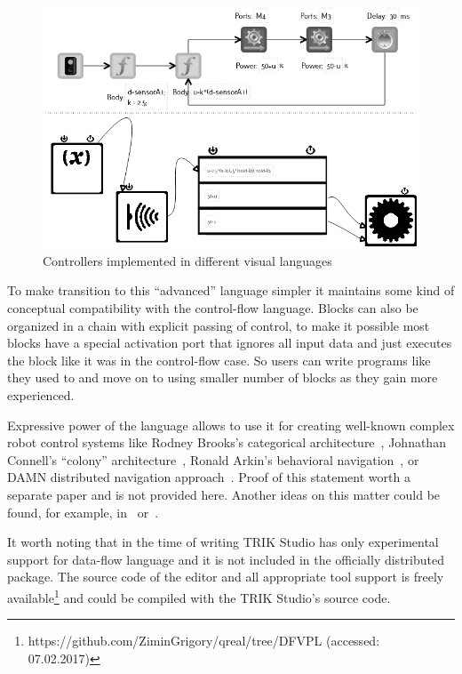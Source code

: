\documentclass[conference]{IEEEtran}
\begin{document}
\begin{figure}[ht]
    \centering
    \includegraphics[width=\columnwidth]{TS_AlongTheBox_Comparison.png}
    \caption{Controllers implemented in different visual languages}
    \label{image:alongTheBox_CF_DF}
\end{figure}

To make transition to this ``advanced'' language simpler it maintains some kind of conceptual compatibility with the control-flow language. Blocks can also be organized in a chain with explicit passing of control, to make it possible most blocks have a special activation port that ignores all input data and just executes the block like it was in the control-flow case. So users can write programs like they used to and move on to using smaller number of blocks as they gain more experienced.

Expressive power of the language allows to use it for creating well-known complex robot control systems like Rodney Brooks's categorical architecture~\cite{brooks1986robust}, Johnathan Connell's ``colony'' architecture~\cite{connell1989colony}, Ronald Arkin's behavioral navigation~\cite{arkin1987motor}, or DAMN distributed navigation approach~\cite{rosenblatt1997damn}. Proof of this statement worth a separate paper and is not provided here. Another ideas on this matter could be found, for example, in~\cite{simpson2009toward} or~\cite{banyasad2000visual}.

It worth noting that in the time of writing TRIK Studio has only experimental support for data-flow language and it is not included in the officially distributed package. The source code of the editor and all appropriate tool support is freely available\footnote{https://github.com/ZiminGrigory/qreal/tree/DFVPL (accessed: 07.02.2017)} and could be compiled with the TRIK Studio's source code.
\end{document}
